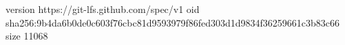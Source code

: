 version https://git-lfs.github.com/spec/v1
oid sha256:9b4da6b0de0c603f76cbc81d9593979f86fed303d1d9834f36259661c3b83c66
size 11068
